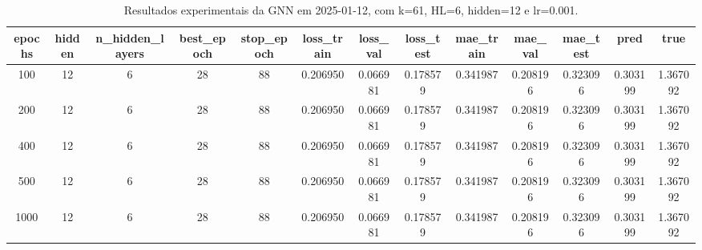 \begin{table}[h]
\centering
\caption{Resultados experimentais da GNN em 2025-01-12, com k=61, HL=6, hidden=12 e lr=0.001.}
\label{tab:gnn_results_k61_hl6_h12_d20250112}
\begin{tabular}{ccccccccccccc}
\toprule
epochs & hidden & n\_hidden\_layers & best\_epoch & stop\_epoch & loss\_train & loss\_val & loss\_test & mae\_train & mae\_val & mae\_test & pred & true \\
\midrule
100 & 12 & 6 & 28 & 88 & 0.206950 & 0.066981 & 0.178579 & 0.341987 & 0.208196 & 0.323096 & 0.303199 & 1.367092 \\
200 & 12 & 6 & 28 & 88 & 0.206950 & 0.066981 & 0.178579 & 0.341987 & 0.208196 & 0.323096 & 0.303199 & 1.367092 \\
400 & 12 & 6 & 28 & 88 & 0.206950 & 0.066981 & 0.178579 & 0.341987 & 0.208196 & 0.323096 & 0.303199 & 1.367092 \\
500 & 12 & 6 & 28 & 88 & 0.206950 & 0.066981 & 0.178579 & 0.341987 & 0.208196 & 0.323096 & 0.303199 & 1.367092 \\
1000 & 12 & 6 & 28 & 88 & 0.206950 & 0.066981 & 0.178579 & 0.341987 & 0.208196 & 0.323096 & 0.303199 & 1.367092 \\
\bottomrule
\end{tabular}
\end{table}
